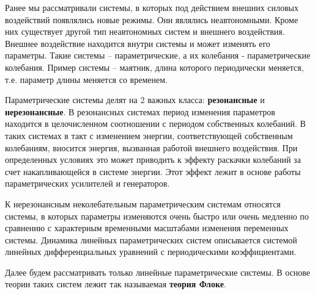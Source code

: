 Ранее мы рассматривали системы, в которых под действием внешних силовых воздействий появлялись новые режимы. Они являлись неавтономными. Кроме них существует другой тип неавтономных систем и внешнего воздействия. Внешнее воздействие находится внутри системы и может изменять его параметры.
Такие системы -- параметрические, а их колебания - параметрические колебания. Пример системы -- маятник, длина которого периодически меняется, т.е. параметр длины меняется со временем. 

Параметрические системы делят на 2 важных класса: \textbf{резонансные} и \textbf{нерезонансные}. В резонансных системах период изменения параметров находится в целочисленном соотношении с периодом собственных колебаний. В таких системах в такт с изменением энергии, соответствующей собственным колебаниям, вносится энергия, вызванная работой внешнего воздействия. При определенных условиях это может приводить к эффекту раскачки колебаний за счет накапливающейся в системе энергии. Этот эффект лежит в основе работы параметрических усилителей и генераторов. 

К нерезонансным неколебательным параметрическим системам относятся системы, в которых параметры изменяются очень быстро или очень медленно по сравнению с характерным временными масштабами изменения переменных системы. Динамика линейных параметрических систем описывается системой линейных дифференциальных уравнений с периодическими коэффициентами. 

Далее будем рассматривать только линейные параметрические системы. В основе теории таких систем лежит так называемая \textbf{теория Флоке}. 

